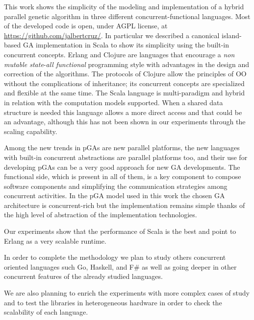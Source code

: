 \noindent This work shows the simplicity of the modeling and implementation of a hybrid parallel genetic algorithm in three different concurrent-functional languages. Most of the developed code is open, under AGPL license, at
\url{https://github.com/jalbertcruz/}. In particular we described a canonical island-based GA implementation in Scala to show its simplicity using the built-in concurrent concepts.
Erlang and Clojure are languages that encourage a \emph{non mutable state}-\emph{all functional} programming style with advantages in the design and correction of the algorithms. The protocols of Clojure allow the principles of OO without the complications of inheritance; its concurrent concepts  are specialized and flexible at the same time. The Scala language is multi-paradigm and hybrid in relation with the computation models supported. When a shared data structure is needed this language allows a more direct access and that could be an advantage, although this has not been shown in our experiments through the scaling capability.

Among the new trends in pGAs are new parallel platforms, the new languages with built-in concurrent abstractions are parallel platforms too, and their use for developing pGAs can be a very good approach for new GA developments. The functional side, which is present in all of them, is a key component to compose software components and simplifying the communication strategies among concurrent activities. In the pGA model used in this work the chosen GA architecture is concurrent-rich but the implementation remains simple thanks of the high level of abstraction of the implementation technologies.

Our experiments show that the performance of Scala is the best and point to Erlang as a very scalable runtime.

In order to complete the methodology we plan to study others concurrent oriented languages such Go, Haskell, and F\# as well as going deeper in other concurrent features of the already studied languages.

We are also planning to enrich the experiments with more complex cases of study and to test the libraries in heterogeneous hardware in order to check the scalability of each language.

